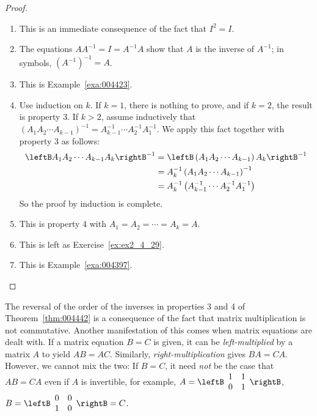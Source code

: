 \begin{proof}
\vspace*{-0.75em}
\begin{enumerate}
\item This is an immediate consequence of the fact that $I^{2} = I$.

\item The equations $AA^{-1} = I = A^{-1}A$ show that $A$ is the inverse of $A^{-1}$; in symbols, $(A^{-1})^{-1} = A$.

\item This is Example~\ref{exa:004423}.

\item Use induction on $k$. If $k = 1$, there is nothing to prove, and if $k = 2$, the result is property 3. If $k > 2$, assume inductively that $(A_1A_2 \cdots A_{k-1})^{-1} = A_{k-1}^{-1} \cdots A_2^{-1}A_1^{-1}$. We apply this fact together with property 3 as follows:
\begin{align*}
\leftB A_{1}A_{2} \cdots A_{k-1}A_{k} \rightB^{-1}
&= \leftB \left(A_{1}A_{2} \cdots A_{k-1}\right)A_{k} \rightB^{-1} \\
&= A_{k}^{-1}\left(A_{1}A_{2} \cdots A_{k-1}\right)^{-1} \\
&= A_{k}^{-1}\left(A_{k-1}^{-1} \cdots A_{2}^{-1}A_{1}^{-1}\right)
\end{align*}
So the proof by induction is complete.

\item This is property 4 with $A_{1} = A_{2} = \cdots  = A_{k} = A$.

\item This is left as Exercise~\ref{ex:ex2_4_29}.

\item This is Example~\ref{exa:004397}.

\end{enumerate}
\vspace*{-2em}\end{proof}

The reversal of the order of the inverses in properties 3 and 4 of Theorem~\ref{thm:004442} is a consequence of the fact that matrix multiplication is not 
commutative. Another manifestation of this comes when matrix equations are dealt with. If a matrix equation $B = C$ is given, it can be \textit{left-multiplied} by a matrix $A$ to yield $AB = AC$. Similarly, \textit{right-multiplication} gives $BA = CA$. However, we cannot mix the two: If $B = C$, it need \textit{not} be the case that $AB = CA$ even if $A$ is invertible, for example, $A = \leftB \begin{array}{rr}
1 & 1 \\
0 & 1
\end{array} \rightB$, $B = \leftB \begin{array}{rr}
0 & 0 \\
1 & 0
\end{array} \rightB = C$.

